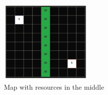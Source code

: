 \begin{figure}[htb]
    \centering
    \includegraphics[width=0.4\textwidth]{images/map_with_resources_in_the_middle.png}
    \caption{Map with resources in the middle}
    \label{figure:map_with_resources_in_the_middle}
\end{figure}